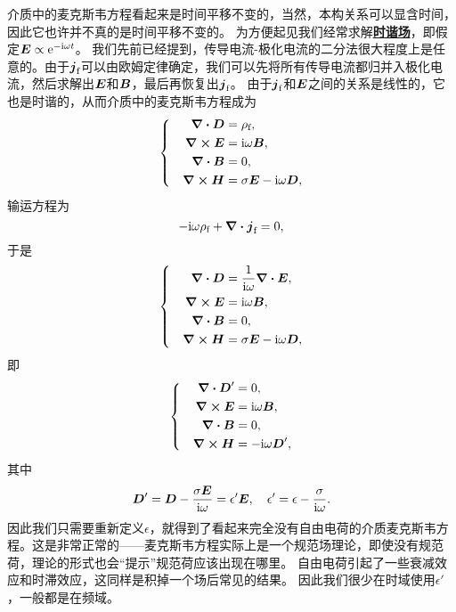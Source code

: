 \documentclass[UTF8, a4paper]{ctexart}
\newcommand*{\ee}{\mathrm{e}}
\newcommand*{\ii}{\mathrm{i}}
\newcommand*{\concept}[1]{\underline{\textbf{#1}}}
\newenvironment{bigcase}{\left\{\quad\begin{aligned}}{\end{aligned}\right.}
\begin{document}
介质中的麦克斯韦方程看起来是时间平移不变的，当然，本构关系可以显含时间，因此它也许并不真的是时间平移不变的。
为方便起见我们经常求解\concept{时谐场}，即假定$\vb*{E} \propto \ee^{- \ii \omega t}$。
我们先前已经提到，传导电流-极化电流的二分法很大程度上是任意的。由于$\vb*{j}_\text{f}$可以由欧姆定律确定，我们可以先将所有传导电流都归并入极化电流，然后求解出$\vb*{E}$和$\vb*{B}$，最后再恢复出$\vb*{j}_\text{f}$。
由于$\vb*{j}_\text{f}$和$\vb*{E}$之间的关系是线性的，它也是时谐的，从而介质中的麦克斯韦方程成为
\[
    \begin{bigcase}
        \div{\vb*{D}} &= \rho_\text{f}, \\
        \curl{\vb*{E}} &= \ii \omega \vb*{B}, \\
        \div{\vb*{B}} &= 0, \\
        \curl{\vb*{H}} &= \sigma \vb*{E} - \ii \omega \vb*{D},
    \end{bigcase}
\]
输运方程为
\[
    -\ii \omega \rho_\text{f} + \div{\vb*{j}_\text{f}} = 0,
\]
于是
\[
    \begin{bigcase}
        \div{\vb*{D}} &= \frac{1}{\ii \omega} \div{\vb*{E}}, \\
        \curl{\vb*{E}} &= \ii \omega \vb*{B}, \\
        \div{\vb*{B}} &= 0, \\
        \curl{\vb*{H}} &= \sigma \vb*{E} - \ii \omega \vb*{D},
    \end{bigcase}
\]
即
\begin{equation}
    \begin{bigcase}
        \div{\vb*{D}'} &= 0, \\
        \curl{\vb*{E}} &= \ii \omega \vb*{B}, \\
        \div{\vb*{B}} &= 0, \\
        \curl{\vb*{H}} &= - \ii \omega \vb*{D}', 
    \end{bigcase}
\end{equation}
其中
\begin{equation}
    \vb*{D}' = \vb*{D} - \frac{\sigma \vb*{E}}{\ii \omega} = \epsilon' \vb*{E}, \quad \epsilon' = \epsilon - \frac{\sigma}{\ii \omega}.
    \label{eq:effective-epsilon}
\end{equation}
因此我们只需要重新定义$\epsilon$，就得到了看起来完全没有自由电荷的介质麦克斯韦方程。这是非常正常的——麦克斯韦方程实际上是一个规范场理论，即使没有规范荷，理论的形式也会“提示”规范荷应该出现在哪里。
自由电荷引起了一些衰减效应和时滞效应，这同样是积掉一个场后常见的结果。
因此我们很少在时域使用$\epsilon'$，一般都是在频域。
\end{document}
